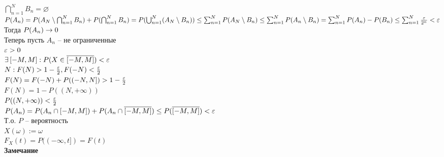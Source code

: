 \documentclass[12pt]{article}
\begin{document}
$\bigcap_{n=1}^N B_n = \varnothing$\\
$P(A_n) = P(A_N \setminus \bigcap_{n=1}^N B_n) + P(\bigcap_{n=1}^N B_n) = P(\bigcup_{n=1}^N (A_N \setminus B_n)) \leq \sum_{n=1}^N P(A_N \setminus B_n) \leq \sum_{n=1}^N P(A_n \setminus B_n) = \sum_{n=1}^N P(A_n) - P(B_n) \leq \sum_{n=1}^N \frac{\varepsilon}{2^n} < \varepsilon$\\
Тогда $P(A_n) \rightarrow 0$\\
Теперь пусть $A_n$ -- не ограниченные\\
$\varepsilon > 0$\\
$\exists\, [-M, M]: P(X \in \overline{[-M, M]}) < \varepsilon$\\
$N: F(N) > 1 - \frac{\varepsilon}2, F(-N) < \frac{\varepsilon}2$\\
$F(N) = F(-N) + P((-N, N]) > 1 -\frac{\varepsilon}2$\\
$F(N) = 1 - P((N, +\infty))$\\
$P((N, +\infty)) < \frac{\varepsilon}2$\\
$P(A_n) = P(A_n\cap [-M, M]) + P(A_n \cap \overline{[-M, M]}) \leq P(\overline{[-M, M]}) < \varepsilon$\\
Т.о. $P$ -- вероятность\\
$X(\omega) := \omega$\\
$F_X(t) = P((-\infty, t]) = F(t)$\\
\textbf{Замечание}\\
\end{document}
